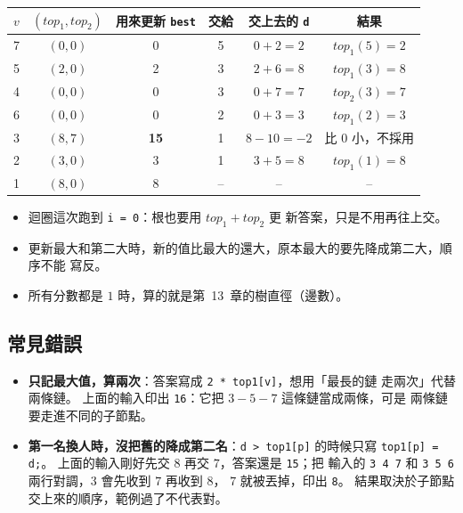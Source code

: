 \begin{center}
\begin{tabular}{cccccc}
\toprule
$v$ & $(\mathit{top}_1, \mathit{top}_2)$ & 用來更新 \texttt{best} & 交給 & 交上去的 \texttt{d} & 結果 \\
\midrule
7 & $(0, 0)$ & 0 & 5 & $0 + 2 = 2$ & $\mathit{top}_1(5) = 2$ \\
5 & $(2, 0)$ & 2 & 3 & $2 + 6 = 8$ & $\mathit{top}_1(3) = 8$ \\
4 & $(0, 0)$ & 0 & 3 & $0 + 7 = 7$ & $\mathit{top}_2(3) = 7$ \\
6 & $(0, 0)$ & 0 & 2 & $0 + 3 = 3$ & $\mathit{top}_1(2) = 3$ \\
3 & $(8, 7)$ & \textbf{15} & 1 & $8 - 10 = -2$ & 比 $0$ 小，不採用 \\
2 & $(3, 0)$ & 3 & 1 & $3 + 5 = 8$ & $\mathit{top}_1(1) = 8$ \\
1 & $(8, 0)$ & 8 & -- & -- & -- \\
\bottomrule
\end{tabular}
\end{center}

\begin{itemize}
\item 迴圈這次跑到 \texttt{i = 0}：根也要用 $\mathit{top}_1 + \mathit{top}_2$ 更
新答案，只是不用再往上交。
\item 更新最大和第二大時，新的值比最大的還大，原本最大的要先降成第二大，順序不能
寫反。
\item 所有分數都是 $1$ 時，算的就是第~13~章的樹直徑（邊數）。
\end{itemize}

\subsection{常見錯誤}

\begin{itemize}
\item \textbf{只記最大值，算兩次}：答案寫成 \texttt{2 * top1[v]}，想用「最長的鏈
走兩次」代替兩條鏈。 上面的輸入印出 \texttt{16}：它把 $3 - 5 - 7$ 這條鏈當成兩條，可是
兩條鏈要走進不同的子節點。
\item \textbf{第一名換人時，沒把舊的降成第二名}：\texttt{d > top1[p]} 的時候只寫
\texttt{top1[p] = d;}。 上面的輸入剛好先交 $8$ 再交 $7$，答案還是 \texttt{15}；把
輸入的 \texttt{3 4 7} 和 \texttt{3 5 6} 兩行對調，$3$ 會先收到 $7$ 再收到 $8$，
$7$ 就被丟掉，印出 \texttt{8}。 結果取決於子節點交上來的順序，範例過了不代表對。
\end{itemize}

